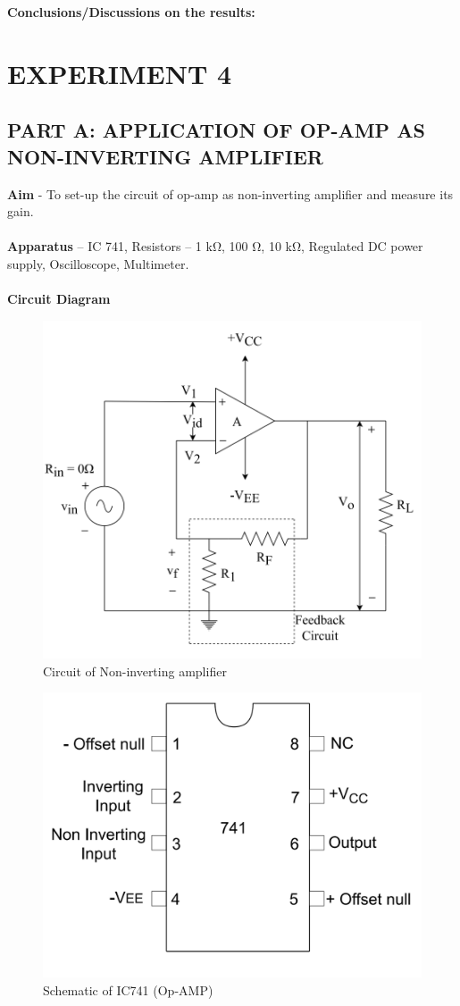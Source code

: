 \documentclass[9pt]{scrreprt}
\begin{document}
\textbf{Conclusions/Discussions on the results:}
\newpage

\chapter*{\Large EXPERIMENT 4}
\setcounter{chapter}{4}
\setcounter{table}{0}
\setcounter{figure}{0}
\section*{\normalsize PART A: APPLICATION OF OP-AMP AS NON-INVERTING AMPLIFIER}
\textbf{Aim} - To set-up the circuit of op-amp as non-inverting amplifier and measure its gain.\\
\\
\textbf{Apparatus} – IC 741, Resistors – 1 k$\si{\ohm}$, 100 $\si{\ohm}$, 10 k$\si{\ohm}$, Regulated DC power supply, Oscilloscope, Multimeter.\\
\\
\textbf{Circuit Diagram}
\begin{figure}[H]
	\centering
	\includegraphics[width=0.5\linewidth]{logos/Non_inv_amp.png}
	\caption{Circuit of Non-inverting amplifier}
	\label{fig:Non_inv_amp}
\end{figure}

\begin{figure}[H]
	\centering
	\includegraphics[width=0.4\linewidth]{logos/IC741.png}
	\caption{Schematic of IC741 (Op-AMP)}
	\label{fig:IC741_op-amp}
\end{figure}
\end{document}
